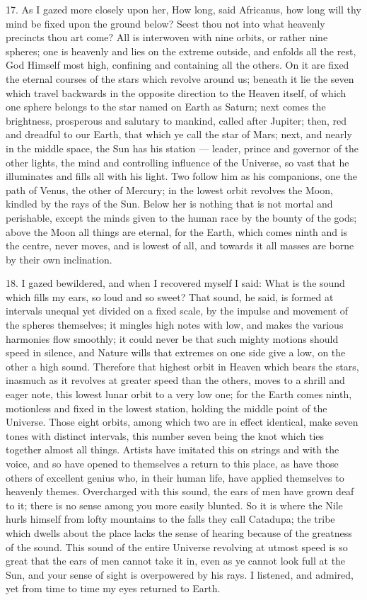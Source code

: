 \documentclass[a4paper, 11pt, oneside, polutonikogreek, english]{article}
\begin{document}
17. As I gazed more closely upon her, How long, said Africanus, how long will thy mind be fixed upon the ground below? Seest thou not into what heavenly precincts thou art come? All is interwoven with nine orbits, or rather nine spheres; one is heavenly and lies on the extreme outside, and enfolds all the rest, God Himself most high, confining and containing all the others. On it are fixed the eternal courses of the stars which revolve around us; beneath it lie the seven which travel backwards in the opposite direction to the Heaven itself, of which one sphere belongs to the star named on Earth as Saturn; next comes the brightness, prosperous and salutary to mankind, called after Jupiter; then, red and dreadful to our Earth, that which ye call the star of Mars; next, and nearly in the middle space, the Sun has his station --- leader, prince and governor of the other lights, the mind and controlling influence of the Universe, so vast that he illuminates and fills all with his light. Two follow him as his companions, one the path of Venus, the other of Mercury; in the lowest orbit revolves the Moon, kindled by the rays of the Sun. Below her is nothing that is not mortal and perishable, except the minds given to the human race by the bounty of the gods; above the Moon all things are eternal, for the Earth, which comes ninth and is the centre, never moves, and is lowest of all, and towards it all masses are borne by their own inclination.

18. I gazed bewildered, and when I recovered myself I said: What is the sound which fills my ears, so loud and so sweet? That sound, he said, is formed at intervals unequal yet divided on a fixed scale, by the impulse and movement of the spheres themselves; it mingles high notes with low, and makes the various harmonies flow smoothly; it could never be that such mighty motions should speed in silence, and Nature wills that extremes on one side give a low, on the other a high sound. Therefore that highest orbit in Heaven which bears the stars, inasmuch as it revolves at greater speed than the others, moves to a shrill and eager note, this lowest lunar orbit to a very low one; for the Earth comes ninth, motionless and fixed in the lowest station, holding the middle point of the Universe. Those eight orbits, among which two are in effect identical, make seven tones with distinct intervals, this number seven being the knot which ties together almost all things. Artists have imitated this on strings and with the voice, and so have opened to themselves a return to this place, as have those others of excellent genius who, in their human life, have applied themselves to heavenly themes. Overcharged with this sound, the ears of men have grown deaf to it; there is no sense among you more easily blunted. So it is where the Nile hurls himself from lofty mountains to the falls they call Catadupa; the tribe which dwells about the place lacks the sense of hearing because of the greatness of the sound. This sound of the entire Universe revolving at utmost speed is so great that the ears of men cannot take it in, even as ye cannot look full at the Sun, and your sense of sight is overpowered by his rays. I listened, and admired, yet from time to time my eyes returned to Earth.
\end{document}
